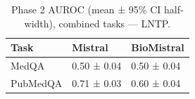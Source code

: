 \begin{table}
\caption{Phase 2 AUROC (mean ± 95\% CI half-width), combined tasks — LNTP.}
\label{tab:phase2_auroc_all_lntp}
\begin{tabular}{lll}
\toprule
Task & Mistral & BioMistral \\
\midrule
MedQA & 0.50 ± 0.04 & 0.50 ± 0.04 \\
PubMedQA & 0.71 ± 0.03 & 0.60 ± 0.04 \\
\bottomrule
\end{tabular}
\end{table}
